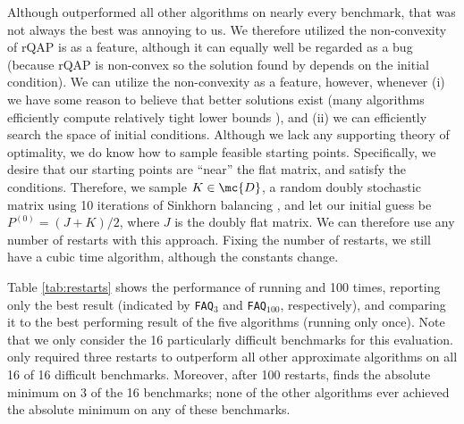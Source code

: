 \documentclass[11pt]{article}
\begin{document}
Although \FAQ outperformed all other algorithms on nearly every benchmark, that \FAQ was not always the best was annoying to us.
% 
We therefore utilized the non-convexity of rQAP is as a feature, although it can equally well be regarded as a bug  (because rQAP is non-convex so the solution found by \FAQ depends on the initial condition).  We can utilize the non-convexity as a feature, however, whenever (i) we have some reason to believe that better solutions exist (many algorithms efficiently compute relatively tight lower bounds \cite{Anstreicher2009}), and (ii) we can efficiently search the space of initial conditions.  Although we lack any supporting theory of optimality, we do know how to sample feasible starting points.  Specifically, we desire that our starting points are ``near'' the flat matrix, and satisfy the conditions.  Therefore, we  sample $K \in \mc{D}$, a random doubly stochastic matrix using 10 iterations of Sinkhorn balancing \cite{Sinkhorn1964}, and let our initial guess be $P^{(0)}=(J+K)/2$, where $J$ is the doubly flat matrix.  We can therefore use any number of restarts with this approach.  Fixing the number of restarts, we still have a cubic time algorithm, although the constants change.  

Table \ref{tab:restarts} shows the performance of running  and 100 times, reporting only the best result (indicated by \texttt{FAQ}$_3$ and \texttt{FAQ}$_{100}$, respectively), and comparing it to the best performing result of the five algorithms (running only \FAQ once). Note that we only consider the 16 particularly difficult benchmarks for this evaluation. \FAQ only required three restarts to outperform all other approximate algorithms on all 16 of 16 difficult benchmarks.  Moreover, after 100 restarts, \FAQ finds the absolute minimum on 3 of the 16 benchmarks; none of the other algorithms ever achieved the absolute minimum on any of these benchmarks. 
\end{document}
